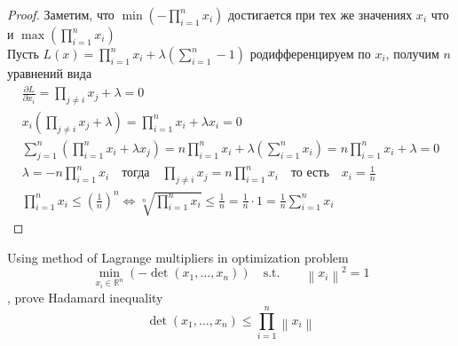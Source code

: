 \begin{proof}
    Заметим, что $\min(-\prod_{i=1}^{n} x_i)$ достигается при тех же значениях $x_i$ что и $\max(\prod_{i=1}^{n} x_i)$\\
    Пусть $L(x) = \prod_{i = 1}^{n} x_i + \lambda(\sum\limits_{i = 1}^{n} - 1)$
    родифференцируем по $x_i$, получим $n$ уравнений вида
    \begin{gather*}
        \frac{\partial L}{\partial x_i} = \prod_{j \ne i} x_j + \lambda = 0\\
        x_i(\prod_{j \ne i} x_j + \lambda) = \prod_{i = 1}^{n} x_i + \lambda x_i = 0\\
        \sum\limits_{j = 1}^{n}(\prod_{i = 1}^{n} x_i + \lambda x_j) = n \prod_{i = 1}^{n} x_i + \lambda (\sum\limits_{i = 1}^{n} x_i) = n \prod_{i = 1}^{n} x_i + \lambda = 0\\
        \lambda = -n \prod_{i = 1}^{n} x_i\quad \text{тогда}\quad
        \prod_{j \ne i}x_j = n \prod_{i = 1}^{n} x_i\quad \text{то есть}\quad
        x_i = \frac{1}{n}\\
        \prod_{i = 1}^{n} x_i \leqslant \left(\frac{1}{n}\right)^{n}
        \Leftrightarrow \sqrt[n]{\prod_{i = 1}^{n} x_i} \leqslant \frac{1}{n}
        = \frac{1}{n} \cdot 1
        = \frac{1}{n} \sum\limits_{i = 1}^{n} x_i
    \end{gather*}
\end{proof}
\vskip 0.4in





\begin{prob}
    Using method of Lagrange multipliers in optimization problem
    $$
    \min _{x_i \in \mathbb{R}^n}\left(-\operatorname{det}\left(x_1, \ldots, x_n\right)\right)\quad \text{s.t.}\qquad \left\|x_i\right\|^2=1
    $$
    , prove Hadamard inequality
    $$
    \operatorname{det}\left(x_1, \ldots, x_n\right) \leq \prod_{i=1}^n\left\|x_i\right\|
    $$
\end{prob}

